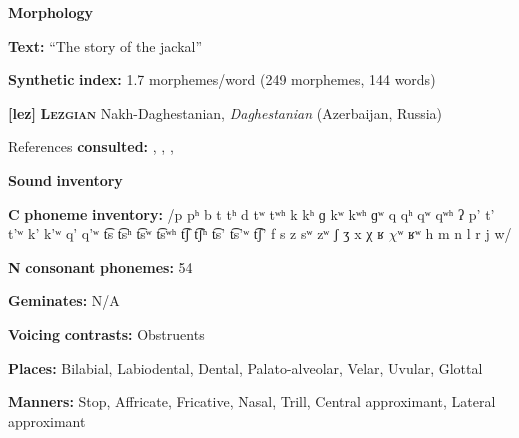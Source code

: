 \begin{styleBody}
\textbf{Morphology}
\end{styleBody}

\begin{styleBody}
\textbf{Text:} “The story of the jackal” \citep[165-168]{Plaisier2007}
\end{styleBody}

\begin{styleBody}
\textbf{Synthetic} \textbf{index:} 1.7 morphemes/word (249 morphemes, 144 words)
\end{styleBody}

\begin{styleBody}
\textbf{[lez]}   \textbf{\textsc{Lezgian}}  Nakh-Daghestanian, \textit{Daghestanian} (Azerbaijan, Russia)
\end{styleBody}

\begin{styleBody}
References \textbf{consulted:} \citet{ChitoranBabaliyeva2007}, \citet{Haspelmath1993}, \citet{Kodzasov1990}, \citet{Yu2004}
\end{styleBody}

\begin{styleBody}
\textbf{Sound} \textbf{inventory}
\end{styleBody}

\begin{styleBody}
\textbf{C} \textbf{phoneme} \textbf{inventory:} /p pʰ b t tʰ d tʷ tʷʰ k kʰ ɡ kʷ kʷʰ ɡʷ q qʰ qʷ qʷʰ ʔ p’ t’ t’ʷ k’ k’ʷ q’ q’ʷ t͡s t͡sʰ t͡sʷ t͡sʷʰ t͡ʃ t͡ʃʰ t͡s’ t͡s’ʷ t͡ʃ’ f s z sʷ zʷ ʃ ʒ x χ ʁ $\chi ʷ$ ʁʷ h m n l r j w/
\end{styleBody}

\begin{styleBody}
\textbf{N} \textbf{consonant} \textbf{phonemes:} 54
\end{styleBody}

\begin{styleBody}
\textbf{Geminates:} N/A
\end{styleBody}

\begin{styleBody}
\textbf{Voicing} \textbf{contrasts:} Obstruents
\end{styleBody}

\begin{styleBody}
\textbf{Places:} Bilabial, Labiodental, Dental, Palato-alveolar, Velar, Uvular, Glottal
\end{styleBody}

\begin{styleBody}
\textbf{Manners:} Stop, Affricate, Fricative, Nasal, Trill, Central approximant, Lateral approximant
\end{styleBody}

